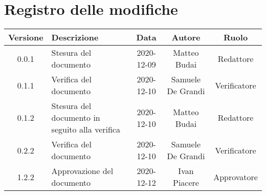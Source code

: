 \section*{Registro delle modifiche}

\begin{center}
	\begin{longtable}{|c|p{5cm}|c|c|c|}
	\hline
	\rowcolor{lighter-grayer}
	\textbf{Versione} & \textbf{Descrizione} & \textbf{Data} & \textbf{Autore} & \textbf{Ruolo} \\
	\hline
	\endfirsthead


		\hline
	0.0.1 & Stesura del documento & 2020-12-09 & Matteo Budai & Redattore \\
	\hline
	0.1.1 & Verifica del documento & 2020-12-10 & Samuele De Grandi & Verificatore \\
	\hline
	0.1.2 & Stesura del documento in seguito alla verifica & 2020-12-10 & Matteo Budai & Redattore \\
	\hline
    0.2.2 & Verifica del documento & 2020-12-10 & Samuele De Grandi & Verificatore \\
    \hline
	1.2.2 & Approvazione del documento & 2020-12-12 & Ivan Piacere & Approvatore \\
	\hline
    
	\end{longtable}
\end{center}